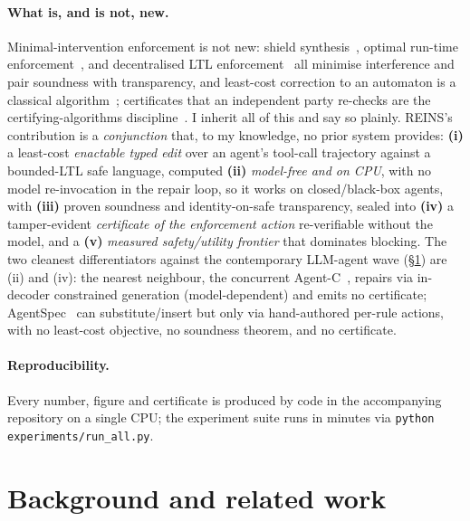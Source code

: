 \documentclass[11pt]{article}
\begin{document}
\paragraph{What is, and is not, new.} Minimal-intervention enforcement is not new:
shield synthesis~\citep{bloem2015shield,alshiekh2018safe}, optimal run-time
enforcement~\citep{pandya2019optimal}, and decentralised LTL
enforcement~\citep{gallay2021decentralized} all minimise interference and pair
soundness with transparency, and least-cost correction to an automaton is a
classical algorithm~\citep{mohri2003editdistance}; certificates that an
independent party re-checks are the certifying-algorithms
discipline~\citep{mcconnell2011certifying}. I inherit all of this and say so
plainly. REINS's contribution is a \emph{conjunction} that, to my knowledge, no
prior system provides: \textbf{(i)} a least-cost \emph{enactable typed edit} over
an agent's tool-call trajectory against a bounded-LTL safe language, computed
\textbf{(ii)} \emph{model-free and on CPU}, with no model re-invocation in the repair
loop, so it works on closed/black-box agents, with \textbf{(iii)} proven
soundness and identity-on-safe transparency, sealed into \textbf{(iv)} a
tamper-evident \emph{certificate of the enforcement action} re-verifiable without
the model, and a \textbf{(v)} \emph{measured safety/utility frontier} that
dominates blocking. The two cleanest differentiators against the contemporary
LLM-agent wave (\S\ref{sec:related}) are (ii) and (iv): the nearest neighbour,
the concurrent Agent-C~\citep{kamath2025agentc}, repairs via in-decoder
constrained generation (model-dependent) and emits no certificate;
AgentSpec~\citep{wang2025agentspec} can substitute/insert but only via
hand-authored per-rule actions, with no least-cost objective, no soundness
theorem, and no certificate.

\paragraph{Reproducibility.} Every number, figure and certificate is produced by
code in the accompanying repository on a single CPU; the experiment suite runs in
minutes via \texttt{python experiments/\allowbreak run\_all.py}.

\section{Background and related work}
\label{sec:related}
\end{document}
